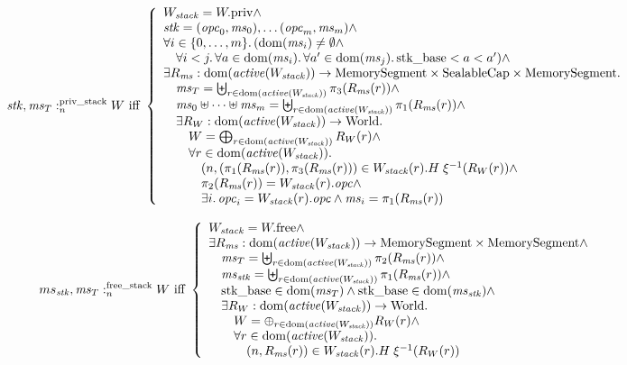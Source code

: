 \documentclass[a4paper]{article}
\begin{document}
\[
  \memSatStack{\stk,\ms_T}{W} \text{ iff } 
  \left\{
    \begin{array}{l}
      W_\var{stack} = \pwpriv \wedge \\
      \stk = (\opc_0,\ms_0), \dots (\opc_m,\ms_m) \wedge \\
      \forall i \in \{0,\dots,m\} \ldotp (\dom(\ms_i) \neq \emptyset \wedge\\
      \quad \forall i < j \ldotp \forall a \in \dom(\ms_i) \ldotp \forall a' \in \dom(\ms_j) \ldotp \stkb < a < a') \wedge\\
      \exists R_\ms : \dom(\activeReg{W_\var{stack}}) \fun \MemSeg \times \SealableCaps \times \MemSeg \ldotp \\
      \quad \ms_T = \biguplus_{r \in \dom(\activeReg{W_\var{stack}})} \pi_3(R_\ms(r)) \wedge \\
      \quad \ms_0 \uplus \dots \uplus \ms_m = \biguplus_{r \in \dom(\activeReg{W_\var{stack}})} \pi_1(R_\ms(r)) \wedge \\
      \quad \exists R_W : \dom(\activeReg{W_\var{stack}}) \fun \World \ldotp \\
      \qquad W = \bigoplus_{r \in \dom(\activeReg{W_\var{stack}})} R_W(r) \wedge \\
      \qquad \forall r \in \dom(\activeReg{W_\var{stack}})\ldotp \\
      \qquad \quad \npair{(\pi_1(R_\ms(r)),\pi_3(R_\ms(r))} \in W_\var{stack}(r).H \; \xi^{-1}(R_W(r)) \wedge\\
      \qquad \quad \pi_2(R_\ms(r)) = W_\var{stack}(r).\opc \wedge\\
      \qquad \quad \exists i \ldotp \opc_i = W_\var{stack}(r).\opc \wedge \ms_i = \pi_1 (R_\ms(r))
    \end{array}
  \right.
\]

\[
  \memSatFStack{ms_\stk,\ms_T}{W} \text{ iff } 
  \left\{
    \begin{array}{l}
      W_\var{stack} = \pwfree \wedge \\
      \exists R_\ms : \dom(\activeReg{W_\var{stack}}) \fun \MemSeg \times \MemSeg \wedge \\
      \quad \ms_T = \biguplus_{r \in \dom(\activeReg{W_\var{stack}})} \pi_2(R_\ms(r)) \wedge \\
      \quad \ms_\stk = \biguplus_{r \in \dom(\activeReg{W_\var{stack}})} \pi_1(R_\ms(r)) \wedge \\
      \quad \stkb \in \dom(\ms_T) \wedge \stkb \in \dom(\ms_\stk) \wedge \\
      \quad \exists R_W : \dom(\activeReg{W_\var{stack}}) \fun \World\ldotp\\
      \qquad W = \oplus_{r \in \dom(\activeReg{W_\var{stack}})} R_W(r) \wedge\\
      \qquad \forall r \in \dom(\activeReg{W_\var{stack}}) \ldotp \\
      \qquad \quad \npair{R_\ms(r)} \in  W_\var{stack}(r).H \; \xi^{-1}(R_W(r))
    \end{array}
  \right.
\]
\end{document}

